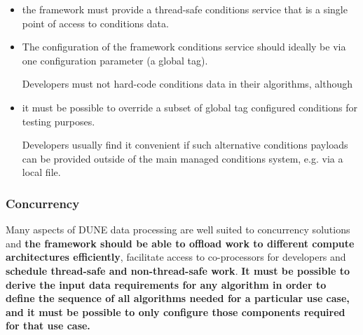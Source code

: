 \documentclass[../main-v1.tex]{subfiles}
\begin{document}
\begin{itemize}
\item the framework must provide a thread-safe conditions service that is a single point of access to conditions data.  

\item The configuration of the framework conditions service should ideally be via one configuration parameter (a global tag). 

Developers must not hard-code conditions data in their algorithms, although 

\item it must be possible to override a subset of global tag configured conditions for testing purposes.  

Developers usually find it convenient if such alternative conditions payloads can be provided outside of the main managed conditions system, e.g. via a local file.
\end{itemize}

\subsubsection{Concurrency} %
Many aspects of DUNE data processing are well suited to concurrency solutions and {\bf the framework should be able to offload work to different compute architectures efficiently}, facilitate access to co-processors for developers and {\bf schedule thread-safe and non-thread-safe work}.  {\bf It must be possible to derive the input data requirements for any algorithm in order to define the sequence of all algorithms needed for a particular use case, and it must be possible to only configure those components required for that use case.}
\end{document}
